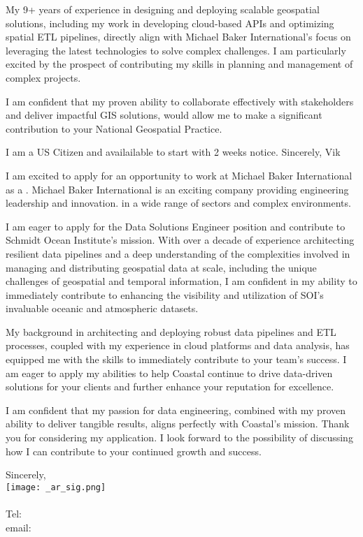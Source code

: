 \documentclass[letterpaper]{article}
\begin{document}
My 9+ years of experience in designing and deploying scalable geospatial solutions, including my work in developing cloud-based APIs and
optimizing spatial ETL pipelines, directly align with Michael Baker International's focus on leveraging the latest technologies to solve complex
challenges. 
I am particularly excited by the prospect of contributing my skills in planning and management of complex projects.

I am confident that my proven ability to
collaborate effectively with stakeholders and deliver impactful GIS solutions,
would allow me to make a significant contribution to your National Geospatial
Practice. 

I am a US Citizen and availailable to start with 2 weeks notice.
Sincerely, Vik

I am excited to apply for an opportunity to work at Michael Baker International as a \JobTitle.
Michael Baker International is an exciting company providing engineering leadership and innovation.
in a wide range of sectors and complex environments.

I am eager to apply for the Data Solutions Engineer position and contribute to Schmidt Ocean Institute's mission.
With over a decade of experience architecting resilient data pipelines and a deep understanding of the
complexities involved in managing and distributing geospatial data at scale,
including the unique challenges of geospatial and temporal information, I am confident in my ability to immediately contribute to enhancing the visibility
and utilization of SOI's invaluable oceanic and atmospheric datasets.

My background in architecting and deploying robust data pipelines and ETL
processes, coupled with my experience in cloud platforms and data analysis, has
equipped me with the skills to immediately contribute to your team's success. I
am eager to apply my abilities to help Coastal continue to drive data-driven
solutions for your clients and further enhance your reputation for excellence.

I am confident that my passion for data engineering, combined with my proven
ability to deliver tangible results, aligns perfectly with Coastal's mission.
Thank you for considering my application. I look forward to the possibility of
discussing how I can contribute to your continued growth and success.

Sincerely,\\
    \hspace{1em}
    \texttt{[image: \_ar\_sig.png]} \\
    \CVsigname \\
    \small
    Tel: \CVphone \\
    email: \CVemail
\end{document}

